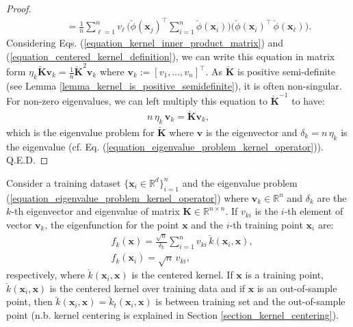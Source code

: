 \documentclass[lang=cn,10pt]{gorgeousnbook}
\numberwithin{equation}{section}%
\numberwithin{figure}{section}%
\begin{document}
\begin{proof}
\begin{align*}
&~~~~~~ =\frac{1}{n} \sum_{\ell=1}^n v_\ell\, \Big( \breve{\phi}(\boldsymbol{x}_j)^\top \sum_{i=1}^n \breve{\phi}(\boldsymbol{x}_i) \Big) \Big( \breve{\phi}(\boldsymbol{x}_i)^\top\, \breve{\phi}(\boldsymbol{x}_\ell) \Big).
\end{align*}
Considering Eqs. (\ref{equation_kernel_inner_product_matrix}) and (\ref{equation_centered_kernel_definition}), we can write this equation in matrix form $\eta_k \breve{\boldsymbol{K}} \boldsymbol{v}_k = \frac{1}{n} \breve{\boldsymbol{K}}^2 \boldsymbol{v}_k$ where $\boldsymbol{v}_k := [v_1, \dots, v_n]^\top$. As $\breve{\boldsymbol{K}}$ is positive semi-definite (see Lemma \ref{lemma_kernel_is_positive_semidefinite}), it is often non-singular. For non-zero eigenvalues, we can left multiply this equation to $\breve{\boldsymbol{K}}^{-1}$ to have:
\begin{align*}
n\, \eta_k\, \boldsymbol{v}_k = \breve{\boldsymbol{K}} \boldsymbol{v}_k,
\end{align*}
which is the eigenvalue problem for $\breve{\boldsymbol{K}}$ where $\boldsymbol{v}$ is the eigenvector and $\delta_k = n\, \eta_k$ is the eigenvalue (cf. Eq. (\ref{equation_eigenvalue_problem_kernel_operator})). Q.E.D.
\end{proof}


\begin{lemma} \label{lemma_relation_eigenfunctions_eigenvectors_for_kernel}
Consider a training dataset $\{\boldsymbol{x}_i \in \mathbb{R}^d\}_{i=1}^n$ and the eigenvalue problem (\ref{equation_eigenvalue_problem_kernel_operator}) where $\boldsymbol{v}_k \in \mathbb{R}^n$ and $\delta_k$ are the $k$-th eigenvector and eigenvalue of matrix $\boldsymbol{K} \in \mathbb{R}^{n \times n}$.
If $v_{ki}$ is the $i$-th element of vector $\boldsymbol{v}_k$, the eigenfunction for the point $\boldsymbol{x}$ and the $i$-th training point $\boldsymbol{x}_i$ are:
\begin{align}
&f_k(\boldsymbol{x}) = \frac{\sqrt{n}}{\delta_k} \sum_{i=1}^n v_{ki}\, \breve{k}(\boldsymbol{x}_i, \boldsymbol{x}), \label{equation_relation_eigenfunction_eigenvector_x} \\
&f_k(\boldsymbol{x}_i) = \sqrt{n}\, v_{ki}, \label{equation_relation_eigenfunction_eigenvector_x_i}
\end{align}
respectively, where $\breve{k}(\boldsymbol{x}_i, \boldsymbol{x})$ is the centered kernel. 
If $\boldsymbol{x}$ is a training point, $\breve{k}(\boldsymbol{x}_i, \boldsymbol{x})$ is the centered kernel over training data and if $\boldsymbol{x}$ is an out-of-sample point, then $\breve{k}(\boldsymbol{x}_i, \boldsymbol{x}) = \breve{k}_t(\boldsymbol{x}_i, \boldsymbol{x})$ is between training set and the out-of-sample point (n.b. kernel centering is explained in Section \ref{section_kernel_centering}). 
\end{lemma}
\end{document}
